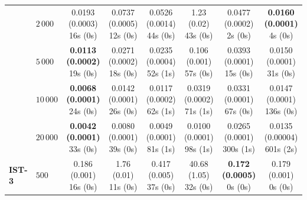 \begin{table}[htbp]
{\begin{tabular}{llcccccc}
 & $2{\,}000$ & \makecell{0.0193 (0.0003) \\ \scriptsize 16s (0s)} & \makecell{0.0737 (0.0005) \\ \scriptsize 12s (0s)} & \makecell{0.0526 (0.0014) \\ \scriptsize 44s (0s)} & \makecell{1.23 (0.02) \\ \scriptsize 43s (0s)} & \makecell{0.0477 (0.0002) \\ \scriptsize 2s (0s)} & \makecell{\textbf{0.0160 (0.0001)} \\ \scriptsize 4s (0s)} \\
 & $5{\,}000$ & \makecell{\textbf{0.0113 (0.0002)} \\ \scriptsize 19s (0s)} & \makecell{0.0271 (0.0002) \\ \scriptsize 18s (0s)} & \makecell{0.0235 (0.0004) \\ \scriptsize 52s (1s)} & \makecell{0.106 (0.001) \\ \scriptsize 57s (0s)} & \makecell{0.0393 (0.0001) \\ \scriptsize 15s (0s)} & \makecell{0.0150 (0.0001) \\ \scriptsize 31s (0s)} \\
 & $10{\,}000$ & \makecell{\textbf{0.0068 (0.0001)} \\ \scriptsize 24s (0s)} & \makecell{0.0142 (0.0001) \\ \scriptsize 26s (0s)} & \makecell{0.0117 (0.0002) \\ \scriptsize 62s (1s)} & \makecell{0.0319 (0.0002) \\ \scriptsize 71s (1s)} & \makecell{0.0331 (0.0001) \\ \scriptsize 67s (0s)} & \makecell{0.0147 (0.0001) \\ \scriptsize 136s (0s)} \\
 & $20{\,}000$ & \makecell{\textbf{0.0042 (0.0001)} \\ \scriptsize 33s (0s)} & \makecell{0.0080 (0.0001) \\ \scriptsize 39s (0s)} & \makecell{0.0049 (0.0001) \\ \scriptsize 81s (1s)} & \makecell{0.0100 (0.0001) \\ \scriptsize 98s (1s)} & \makecell{0.0265 (0.0001) \\ \scriptsize 300s (1s)} & \makecell{0.0135 (0.00004) \\ \scriptsize 601s (2s)} \\
\hline
\textbf{IST-3} & $500$ & \makecell{0.186 (0.001) \\ \scriptsize 16s (0s)} & \makecell{1.76 (0.01) \\ \scriptsize 11s (0s)} & \makecell{0.417 (0.005) \\ \scriptsize 37s (0s)} & \makecell{40.68 (1.05) \\ \scriptsize 32s (0s)} & \makecell{\textbf{0.172 (0.0005)} \\ \scriptsize 0s (0s)} & \makecell{0.179 (0.001) \\ \scriptsize 0s (0s)} \\

\end{tabular}}
\end{table}
